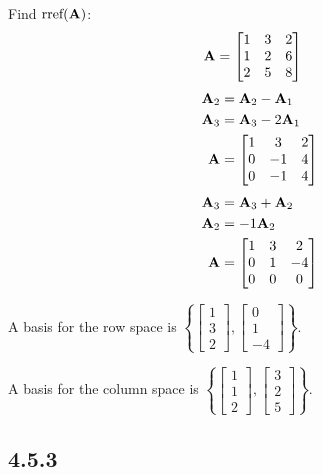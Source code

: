 \documentclass{article}
\begin{document}
Find $ \text{rref}(\mathbf{A}) $:
\begin{align*}
	\mathbf{A} & =
		\begin{bmatrix}
			1 & 3 & 2 \\
			1 & 2 & 6 \\
			2 & 5 & 8
		\end{bmatrix}
\end{align*}
\begin{align*}
	\mathbf{A}_2 & = \mathbf{A}_2 - \mathbf{A}_1 \\
	\mathbf{A}_3 & = \mathbf{A}_3 - 2\mathbf{A}_1 \\
	\mathbf{A} & =
		\begin{bmatrix}
			1 & 3 & 2 \\
			0 & -1 & 4 \\
			0 & -1 & 4
		\end{bmatrix}
\end{align*}
\begin{align*}
	\mathbf{A}_3 & = \mathbf{A}_3 + \mathbf{A}_2 \\
	\mathbf{A}_2 & = -1\mathbf{A}_2 \\
	\mathbf{A} & =
		\begin{bmatrix}
			1 & 3 & 2 \\
			0 & 1 & -4 \\
			0 & 0 & 0
		\end{bmatrix}
\end{align*}
\begin{mdframed}
	A basis for the row space is
	$ \left\{ \begin{bmatrix} 1 \\ 3 \\ 2 \end{bmatrix}, \begin{bmatrix} 0 \\ 1 \\ -4 \end{bmatrix} \right\} $.
	
	A basis for the column space is
	$ \left\{ \begin{bmatrix} 1 \\ 1 \\ 2 \end{bmatrix}, \begin{bmatrix} 3 \\ 2 \\ 5 \end{bmatrix} \right\} $.
\end{mdframed}

\subsection{4.5.3}
\end{document}
